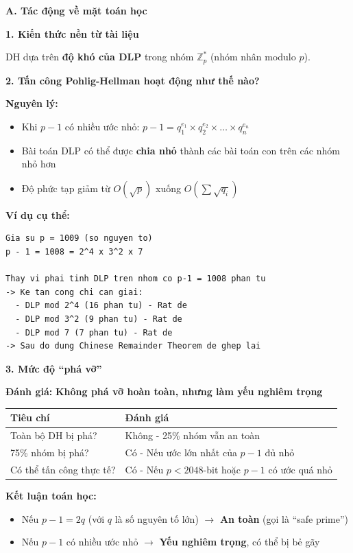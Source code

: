 \textbf{A. Tác động về mặt toán học}

\textbf{1. Kiến thức nền từ tài liệu}

DH dựa trên \textbf{độ khó của DLP} trong nhóm $\mathbb{Z}_p^*$ (nhóm nhân modulo $p$).

\textbf{2. Tấn công Pohlig-Hellman hoạt động như thế nào?}

\textbf{Nguyên lý:}
\begin{itemize}
    \item Khi $p-1$ có nhiều ước nhỏ: $p-1 = q_1^{e_1} \times q_2^{e_2} \times \ldots \times q_n^{e_n}$
    \item Bài toán DLP có thể được \textbf{chia nhỏ} thành các bài toán con trên các nhóm nhỏ hơn
    \item Độ phức tạp giảm từ $O(\sqrt{p})$ xuống $O(\sum \sqrt{q_i})$
\end{itemize}

\textbf{Ví dụ cụ thể:}

\begin{verbatim}
Gia su p = 1009 (so nguyen to)
p - 1 = 1008 = 2^4 x 3^2 x 7

Thay vi phai tinh DLP tren nhom co p-1 = 1008 phan tu
-> Ke tan cong chi can giai:
  - DLP mod 2^4 (16 phan tu) - Rat de
  - DLP mod 3^2 (9 phan tu) - Rat de
  - DLP mod 7 (7 phan tu) - Rat de
-> Sau do dung Chinese Remainder Theorem de ghep lai
\end{verbatim}

\textbf{3. Mức độ ``phá vỡ''}

\textbf{Đánh giá:} \textbf{Không phá vỡ hoàn toàn, nhưng làm yếu nghiêm trọng}

\begin{center}
\begin{tabular}{|p{6cm}|p{6cm}|}
\hline
\textbf{Tiêu chí} & \textbf{Đánh giá} \\
\hline
Toàn bộ DH bị phá? & Không - 25\% nhóm vẫn an toàn \\
75\% nhóm bị phá? & Có - Nếu ước lớn nhất của $p-1$ đủ nhỏ \\
Có thể tấn công thực tế? & Có - Nếu $p < 2048$-bit hoặc $p-1$ có ước quá nhỏ \\
\hline
\end{tabular}
\end{center}

\textbf{Kết luận toán học:}
\begin{itemize}
    \item Nếu $p-1 = 2q$ (với $q$ là số nguyên tố lớn) $\rightarrow$ \textbf{An toàn} (gọi là ``safe prime'')
    \item Nếu $p-1$ có nhiều ước nhỏ $\rightarrow$ \textbf{Yếu nghiêm trọng}, có thể bị bẻ gãy
\end{itemize}

